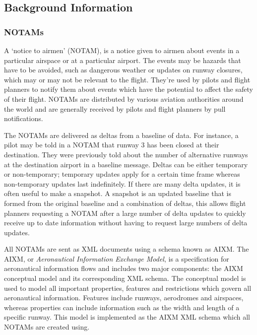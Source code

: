 \documentclass[a4paper, 12pt]{article}
\begin{document}
\subsection{Background Information}

\subsubsection{NOTAMs}
A `notice to airmen' (NOTAM), is a notice given to airmen about events in a particular airspace or at a particular airport. The events may be hazards that have to be avoided, such as dangerous weather or updates on runway closures, which may or may not be relevant to the flight. They're used by pilots and flight planners to notify them about events which have the potential to affect the safety of their flight. NOTAMs are distributed by various aviation authorities around the world and are generally received by pilots and flight planners by pull notifications.

The NOTAMs are delivered as deltas from a baseline of data. For instance, a pilot may be told in a NOTAM that runway 3 has been closed at their destination. They were previously told about the number of alternative runways at the destination airport in a baseline message. Deltas can be either temporary or non-temporary; temporary updates apply for a certain time frame whereas non-temporary updates last indefinitely. If there are many delta updates, it is often useful to make a snapshot. A snapshot is an updated baseline that is formed from the original baseline and a combination of deltas, this allows flight planners requesting a NOTAM after a large number of delta updates to quickly receive up to date information without having to request large numbers of delta updates.

All NOTAMs are sent as XML documents using a schema known as AIXM. The AIXM, or \emph{Aeronautical Information Exchange Model}, is a specification for aeronautical information flows and includes two major components: the AIXM conceptual model and its corresponding XML schema. The conceptual model is used to model all important properties, features and restrictions which govern all aeronautical information. Features include runways, aerodromes and airspaces, whereas properties can include information such as the width and length of a specific runway. This model is implemented as the AIXM XML schema which all NOTAMs are created using.
\end{document}
